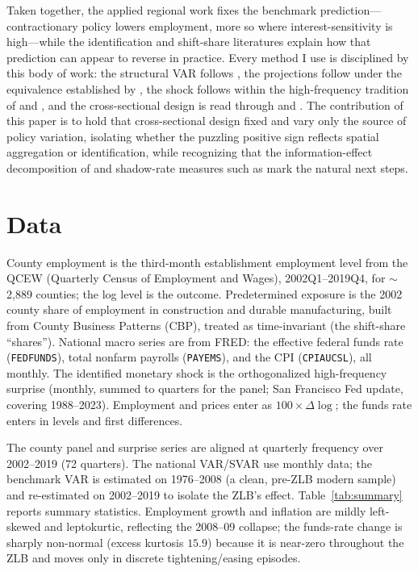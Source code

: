 \documentclass[11pt]{article}
\begin{document}
Taken together, the applied regional work fixes the benchmark prediction---contractionary policy
lowers employment, more so where interest-sensitivity is high---while the identification and
shift-share literatures explain how that prediction can appear to reverse in practice. Every method
I use is disciplined by this body of work: the structural VAR follows \citet{cee1999}, the
projections follow \citet{jorda2005} under the equivalence established by \citet{plagborg2021}, the
shock follows \citet{bauerswanson2023} within the high-frequency tradition of \citet{gss2005} and
\citet{nakamura2018}, and the cross-sectional design is read through \citet{gpss2020} and
\citet{borusyak2022}. The contribution of this paper is to hold that cross-sectional design fixed
and vary only the source of policy variation, isolating whether the puzzling positive sign reflects
spatial aggregation or identification, while recognizing that the information-effect decomposition
of \citet{jarocinski2020} and shadow-rate measures such as \citet{wuxia2016} mark the natural next
steps.

\section{Data}

County employment is the third-month establishment employment
level from the QCEW (Quarterly Census of Employment and Wages), 2002Q1--2019Q4, for $\sim$2{,}889
counties; the log level is the outcome. Predetermined exposure is the 2002 county share of
employment in construction and durable manufacturing, built from County Business Patterns (CBP),
treated as time-invariant (the shift-share ``shares''). National macro series are from FRED:
the effective federal funds rate (\texttt{FEDFUNDS}), total nonfarm payrolls (\texttt{PAYEMS}),
and the CPI (\texttt{CPIAUCSL}), all monthly. The identified monetary shock is the
\citet{bauerswanson2023} orthogonalized high-frequency surprise (monthly, summed to quarters for
the panel; San Francisco Fed update, covering 1988--2023). Employment and prices enter as
$100\times\Delta\log$; the funds rate enters in levels and first differences.

The county panel and surprise series are aligned at
quarterly frequency over 2002--2019 (72 quarters). The national VAR/SVAR use monthly data; the
benchmark VAR is estimated on 1976--2008 (a clean, pre-ZLB modern sample) and re-estimated on
2002--2019 to isolate the ZLB's effect. Table~\ref{tab:summary} reports summary statistics.
Employment growth and inflation are mildly left-skewed and leptokurtic, reflecting the 2008--09
collapse; the funds-rate change is sharply non-normal (excess kurtosis $15.9$) because it is
near-zero throughout the ZLB and moves only in discrete tightening/easing episodes.
\end{document}
